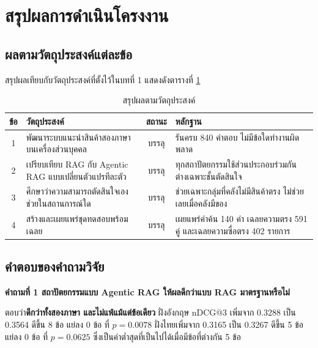 
\section{สรุปผลการดำเนินโครงงาน}

\subsection{ผลตามวัตถุประสงค์แต่ละข้อ}

สรุปผลเทียบกับวัตถุประสงค์ที่ตั้งไว้ในบทที่ 1 แสดงดังตารางที่ \ref{tab:obj_summary}

\begin{table}[H]
\centering
\caption{สรุปผลตามวัตถุประสงค์}
\label{tab:obj_summary}
\begin{tabular}{|c|p{5.4cm}|c|p{5.0cm}|}
\hline
\textbf{ข้อ} & \textbf{วัตถุประสงค์} & \textbf{สถานะ} & \textbf{หลักฐาน} \\
\hline
1 & พัฒนาระบบแนะนำสินค้าสองภาษาบนเครื่องส่วนบุคคล & บรรลุ & รันครบ 840 คำตอบ ไม่มีข้อใดทำงานผิดพลาด \\ \hline
2 & เปรียบเทียบ RAG กับ Agentic RAG แบบเปลี่ยนตัวแปรทีละตัว & บรรลุ & ทุกสถาปัตยกรรมใช้ส่วนประกอบร่วมกัน ต่างเฉพาะชั้นตัดสินใจ \\ \hline
3 & ศึกษาว่าความสามารถตัดสินใจเองช่วยในสถานการณ์ใด & บรรลุ & ช่วยเฉพาะกลุ่มที่คลังไม่มีสินค้าตรง ไม่ช่วยเลยเมื่อคลังมีของ \\ \hline
4 & สร้างและเผยแพร่ชุดทดสอบพร้อมเฉลย & บรรลุ & เผยแพร่คำค้น 140 คำ เฉลยความตรง 591 คู่ และเฉลยความซื่อตรง 402 รายการ \\
\hline
\end{tabular}
\end{table}

\subsection{คำตอบของคำถามวิจัย}

\textbf{คำถามที่ 1 สถาปัตยกรรมแบบ Agentic RAG ให้ผลดีกว่าแบบ RAG มาตรฐานหรือไม่}

ตอบว่า\textbf{ดีกว่าทั้งสองภาษา และไม่แพ้แม้แต่ข้อเดียว} ฝั่งอังกฤษ nDCG@3 เพิ่มจาก 0.3288 เป็น 0.3564 ดีขึ้น 8 ข้อ แย่ลง 0 ข้อ ที่ $p = 0.0078$ ฝั่งไทยเพิ่มจาก 0.3165 เป็น 0.3267 ดีขึ้น 5 ข้อ แย่ลง 0 ข้อ ที่ $p = 0.0625$ ซึ่งเป็นค่าต่ำสุดที่เป็นไปได้เมื่อมีข้อที่ต่างกัน 5 ข้อ

